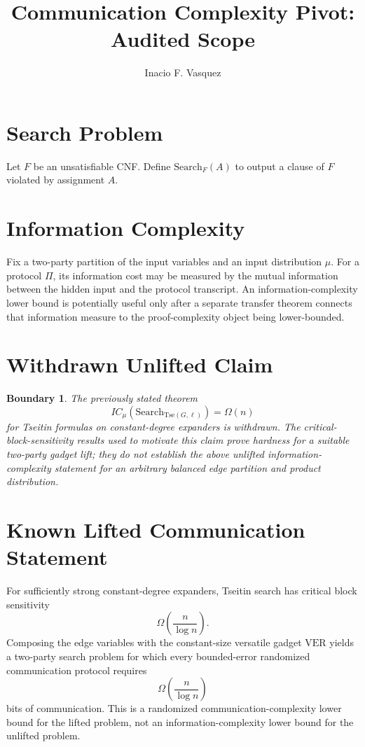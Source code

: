 \documentclass[11pt]{article}
\title{Communication Complexity Pivot: Audited Scope}
\author{Inacio F. Vasquez}
\date{}
\newtheorem{boundary}{Boundary}
\begin{document}
\maketitle

\section*{Search Problem}

Let $F$ be an unsatisfiable CNF.  Define $\mathrm{Search}_F(A)$ to output a
clause of $F$ violated by assignment $A$.

\section*{Information Complexity}

Fix a two-party partition of the input variables and an input distribution
$\mu$.  For a protocol $\Pi$, its information cost may be measured by the
mutual information between the hidden input and the protocol transcript.  An
information-complexity lower bound is potentially useful only after a separate
transfer theorem connects that information measure to the proof-complexity
object being lower-bounded.

\section*{Withdrawn Unlifted Claim}

\begin{boundary}
The previously stated theorem
\[
IC_\mu(\mathrm{Search}_{\mathrm{Tse}(G,\ell)})=\Omega(n)
\]
for Tseitin formulas on constant-degree expanders is withdrawn.  The
critical-block-sensitivity results used to motivate this claim prove hardness
for a suitable two-party \emph{gadget lift}; they do not establish the above
unlifted information-complexity statement for an arbitrary balanced edge
partition and product distribution.
\end{boundary}

\section*{Known Lifted Communication Statement}

For sufficiently strong constant-degree expanders, Tseitin search has critical
block sensitivity
\[
\Omega\!\left(\frac{n}{\log n}\right).
\]
Composing the edge variables with the constant-size versatile gadget
$\mathrm{VER}$ yields a two-party search problem for which every bounded-error
randomized communication protocol requires
\[
\Omega\!\left(\frac{n}{\log n}\right)
\]
bits of communication.  This is a randomized communication-complexity lower
bound for the lifted problem, not an information-complexity lower bound for the
unlifted problem.
\end{document}

